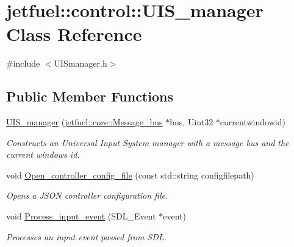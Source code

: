 \hypertarget{classjetfuel_1_1control_1_1UIS__manager}{}\section{jetfuel\+:\+:control\+:\+:U\+I\+S\+\_\+manager Class Reference}
\label{classjetfuel_1_1control_1_1UIS__manager}


{\ttfamily \#include $<$U\+I\+Smanager.\+h$>$}

\subsection*{Public Member Functions}
\begin{DoxyCompactItemize}
\item 
\hyperlink{classjetfuel_1_1control_1_1UIS__manager_a04d1feda567af305a4495b189ef9bc8f}{U\+I\+S\+\_\+manager} (\hyperlink{classjetfuel_1_1core_1_1Message__bus}{jetfuel\+::core\+::\+Message\+\_\+bus} $\ast$bus, Uint32 $\ast$currentwindowid)
\begin{DoxyCompactList}\small\item\em Constructs an Universal Input System manager with a message bus and the current window\textquotesingle{}s id. \end{DoxyCompactList}\item 
void \hyperlink{classjetfuel_1_1control_1_1UIS__manager_a8a15d34ba4ae580ef4d39250695a16e3}{Open\+\_\+controller\+\_\+config\+\_\+file} (const std\+::string configfilepath)
\begin{DoxyCompactList}\small\item\em Opens a J\+S\+ON controller configuration file. \end{DoxyCompactList}\item 
void \hyperlink{classjetfuel_1_1control_1_1UIS__manager_a389d615922d1d3f408e46ae05c37d125}{Process\+\_\+input\+\_\+event} (S\+D\+L\+\_\+\+Event $\ast$event)
\begin{DoxyCompactList}\small\item\em Processes an input event passed from S\+DL. \end{DoxyCompactList}\end{DoxyCompactItemize}
